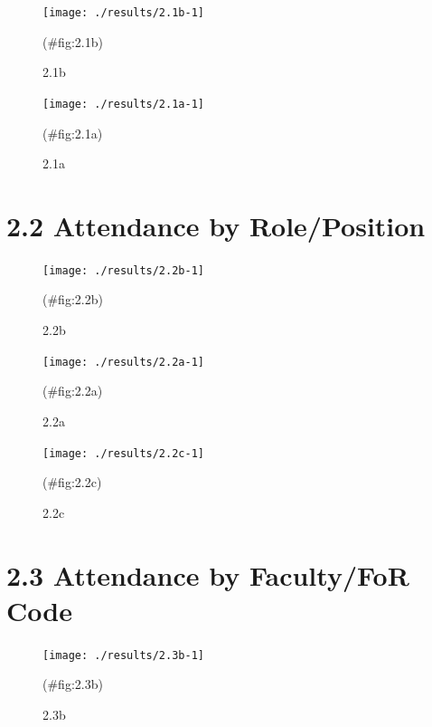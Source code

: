 \documentclass[
]{article}
\begin{document}
\begin{figure}[H]

{\centering \texttt{[image: ./results/2.1b-1]} 

}

\caption{2.1b}(\#fig:2.1b)
\end{figure}

\begin{figure}[H]

{\centering \texttt{[image: ./results/2.1a-1]} 

}

\caption{2.1a}(\#fig:2.1a)
\end{figure}

\hypertarget{attendance-by-roleposition}{%
\section{2.2 Attendance by Role/Position}\label{attendance-by-roleposition}}

\begin{figure}[H]

{\centering \texttt{[image: ./results/2.2b-1]} 

}

\caption{2.2b}(\#fig:2.2b)
\end{figure}

\begin{figure}[H]

{\centering \texttt{[image: ./results/2.2a-1]} 

}

\caption{2.2a}(\#fig:2.2a)
\end{figure}

\begin{figure}[H]

{\centering \texttt{[image: ./results/2.2c-1]} 

}

\caption{2.2c}(\#fig:2.2c)
\end{figure}

\hypertarget{attendance-by-facultyfor-code}{%
\section{2.3 Attendance by Faculty/FoR Code}\label{attendance-by-facultyfor-code}}

\begin{figure}[H]

{\centering \texttt{[image: ./results/2.3b-1]} 

}

\caption{2.3b}(\#fig:2.3b)
\end{figure}
\end{document}
